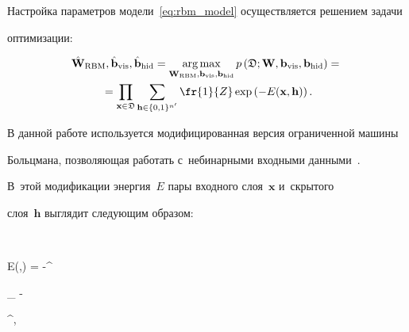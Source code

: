 Настройка параметров модели~\eqref{eq:rbm_model} осуществляется решением задачи 


оптимизации:





\vspace*{-2pt}





\noindent


\begin{multline}


\label{eq:rbm}


\hat{\mathbf{W}}_{\mathrm{RBM}},\hat{\mathbf{b}}_{\mathrm{vis}}, 


\hat{\mathbf{b}}_{\mathrm{hid}} = 


\mathop{\mathrm{arg\,max}}_{{\mathbf{W}_{\mathrm{RBM}}},{\mathbf{b}}_\text{vis}, 


{\mathbf{b}}_{\mathrm{hid}} } p\left(\mathfrak{D}; 


{\mathbf{W}},{\mathbf{b}_{\mathrm{vis}}},{\mathbf{b}_{\mathrm{hid}}}\right) = {}\\


{}=


\prod\limits_{\mathbf{x} \in \mathfrak{D}} \sum\limits_{\mathbf{h}\in \{0,1\}^{n'}} 


\fr{1}{Z} \exp\left(


-E(\mathbf{\mathbf{x}},\mathbf{h)}\right).


\end{multline}


В данной работе используется модифицированная версия ограниченной машины 


Больцмана, позволяющая работать с~небинарными входными данными~\cite{gbrbm}. 


В~этой модификации энергия~$E$ пары входного слоя~$\mathbf{x}$ и~скрытого 


слоя~$\mathbf{h}$ выглядит следующим образом:





\noindent


$$


E(,) =  -^{} \cdot 


_{} - 


^{},


